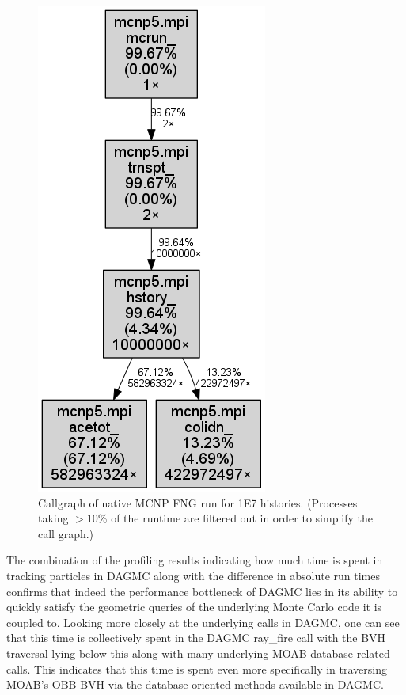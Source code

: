 \documentclass[12pt, a4paper]{article}
\begin{document}
\begin{figure}[H]
  \centering
  \caption{Callgraph of native MCNP FNG run for 1E7 histories. (Processes taking $>$10\% of the runtime are filtered out in order to simplify the call graph.)}
  \label{mcnp-fng-coarse}
  \includegraphics[scale=0.35]{native_fng_cg_coarse.png}
\end{figure}

The combination of the profiling results indicating how much time is spent in tracking particles in DAGMC along with the difference in absolute run times confirms that indeed the performance bottleneck of DAGMC lies in its ability to quickly satisfy the geometric queries of the underlying Monte Carlo code it is coupled to. Looking more closely at the underlying calls in DAGMC, one can see that this time is collectively spent in the DAGMC ray\_fire call with the BVH traversal lying below this along with many underlying MOAB database-related calls. This indicates that this time is spent even more specifically in traversing MOAB's OBB BVH via the database-oriented methods available in DAGMC.
\end{document}
